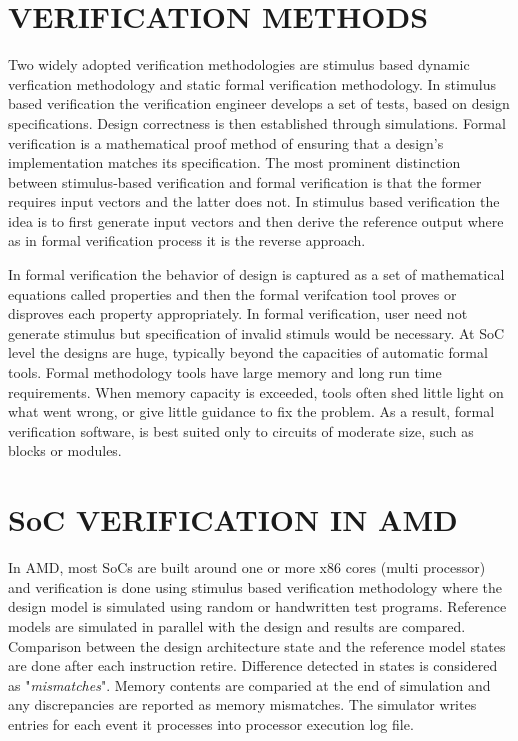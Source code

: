 \section{VERIFICATION METHODS}
Two widely adopted verification methodologies are stimulus based dynamic verfication methodology and static formal verification methodology. In stimulus based verification the verification engineer develops a set of tests, based on design specifications. Design correctness is then established through simulations. Formal verification is a mathematical proof method of ensuring that a design's implementation matches its specification. The most prominent distinction between stimulus-based verification and formal verification is that the former requires input vectors and the latter does not. In stimulus based verification the idea is to first generate input vectors and then derive the reference output where as in formal verification process it is the reverse approach.

In formal verification the behavior of design is captured as a set of mathematical equations called properties and then the formal verifcation tool proves or disproves each property appropriately. In formal verification, user need not generate stimulus but specification of invalid stimuls would be necessary.  At SoC level the designs are huge, typically beyond the capacities of automatic formal tools. Formal methodology tools have large memory and long run time requirements. When memory capacity is exceeded, tools often shed little light on what went wrong, or give little guidance to fix the problem. As a result, formal verification software, is best suited only to circuits of moderate size, such as blocks or modules. 

\section{SoC VERIFICATION IN AMD}
In AMD, most SoCs are built around one or more x86 cores (multi processor) and verification is done using stimulus based verification methodology where the design model is simulated using random or handwritten test programs. Reference models are simulated in parallel with the design and results are compared.  Comparison between the design architecture state and the reference model states are done after each instruction retire. Difference detected in states is considered as "{\it mismatches}". Memory contents are comparied at the end of simulation and any discrepancies are reported as memory mismatches.  The simulator writes entries for each event it processes into processor execution log file. 

